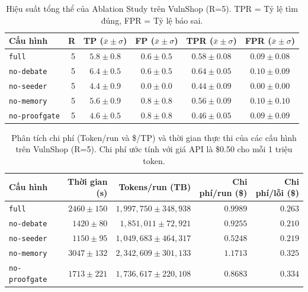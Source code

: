 \begin{table}[H]
\centering
\renewcommand{\arraystretch}{1.3}
\caption{Hiệu suất tổng thể của Ablation Study trên VulnShop (R=5). TPR = Tỷ lệ tìm đúng, FPR = Tỷ lệ báo sai.}
\label{tab:ablation}
\begin{tabular}{lrcccc}
\toprule
\textbf{Cấu hình} & \textbf{R} & \textbf{TP ($\bar{x} \pm \sigma$)} & \textbf{FP ($\bar{x} \pm \sigma$)} & \textbf{TPR ($\bar{x} \pm \sigma$)} & \textbf{FPR ($\bar{x} \pm \sigma$)} \\
\midrule
\texttt{full} & 5 & $5.8 \pm 0.8$ & $0.6 \pm 0.5$ & $0.58 \pm 0.08$ & $0.09 \pm 0.08$ \\
\texttt{no-debate} & 5 & $6.4 \pm 0.5$ & $0.6 \pm 0.5$ & $0.64 \pm 0.05$ & $0.10 \pm 0.09$ \\
\texttt{no-seeder} & 5 & $4.4 \pm 0.9$ & $0.0 \pm 0.0$ & $0.44 \pm 0.09$ & $0.00 \pm 0.00$ \\
\texttt{no-memory} & 5 & $5.6 \pm 0.9$ & $0.8 \pm 0.8$ & $0.56 \pm 0.09$ & $0.10 \pm 0.10$ \\
\texttt{no-proofgate} & 5 & $4.6 \pm 0.5$ & $0.8 \pm 0.8$ & $0.46 \pm 0.05$ & $0.09 \pm 0.09$ \\
\bottomrule
\end{tabular}
\end{table}

\begin{table}[H]
\centering
\renewcommand{\arraystretch}{1.3}
\caption{Phân tích chi phí (Token/run và \$/TP) và thời gian thực thi của các cấu hình trên VulnShop (R=5). Chi phí ước tính với giá API là \$0.50 cho mỗi 1 triệu token.}
\label{tab:cost_analysis}
\begin{tabular}{lrrrr}
\toprule
\textbf{Cấu hình} & \textbf{Thời gian (s)} & \textbf{Tokens/run (TB)} & \textbf{Chi phí/run (\$)} & \textbf{Chi phí/lỗi (\$)} \\
\midrule
\texttt{full} & $2460 \pm 150$ & $1,997,750 \pm 348,938$ & $0.9989$ & $0.263$ \\
\texttt{no-debate} & $1420 \pm 80$ & $1,851,011 \pm 72,921$ & $0.9255$ & $0.210$ \\
\texttt{no-seeder} & $1150 \pm 95$ & $1,049,683 \pm 464,317$ & $0.5248$ & $0.219$ \\
\texttt{no-memory} & $3047 \pm 132$ & $2,342,609 \pm 301,133$ & $1.1713$ & $0.325$ \\
\texttt{no-proofgate} & $1713 \pm 221$ & $1,736,617 \pm 220,108$ & $0.8683$ & $0.334$ \\
\bottomrule
\end{tabular}
\end{table}

